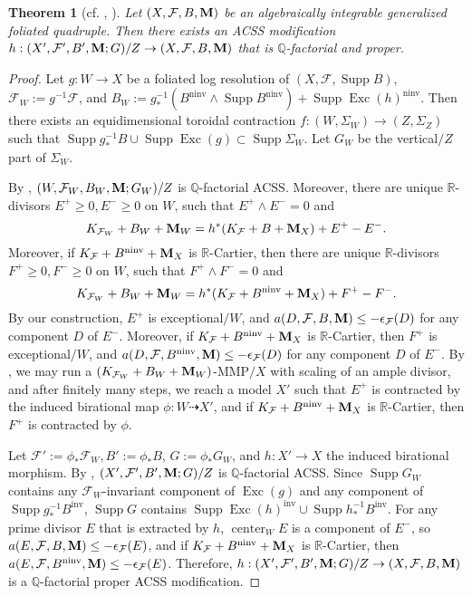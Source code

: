 \documentclass[12pt]{amsart}
\numberwithin{equation}{section}
\newcommand{\Mm}{{\bf{M}}}
\newcommand{\Qq}{\mathbb{Q}}
\newcommand{\Rr}{\mathbb{R}}
\newcommand{\Center}{\operatorname{center}}
\newcommand{\Exc}{\operatorname{Exc}}
\newcommand{\ninv}{\operatorname{ninv}}
\newcommand{\inv}{\operatorname{inv}}
\newcommand{\Supp}{\operatorname{Supp}}
\newcommand{\Ff}{\mathcal{F}}
\newtheorem{thm}{Theorem}[section]
\theoremstyle{definition}
\theoremstyle{definition}
\theoremstyle{definition}
\begin{document}
\begin{thm}[{cf. \cite[Theorem 8.2.2]{CHLX23}, \cite[Theorem 3.10]{ACSS21}}]\label{thm: eo acss model}
    Let $(X,\Ff,B,\Mm)$ be an algebraically integrable generalized foliated quadruple. Then there exists an ACSS modification $h: (X',\Ff',B',\Mm;G)/Z\rightarrow (X,\Ff,B,\Mm)$ that is $\Qq$-factorial and proper.
\end{thm}
\begin{proof}
    Let $g: W\rightarrow X$ be a foliated log resolution of $(X,\Ff,\Supp B)$, $\Ff_W:=g^{-1}\Ff$, and $B_W:=g^{-1}_\ast (B^{\ninv}\wedge\Supp B^{\ninv})+\Supp\Exc(h)^{\ninv}$. Then there exists an equidimensional toroidal contraction $f: (W,\Sigma_W)\rightarrow (Z,\Sigma_Z)$ such that $\Supp g^{-1}_\ast B\cup\Supp\Exc(g)\subset\Supp\Sigma_W$. Let $G_W$ be the vertical$/Z$ part of $\Sigma_W$. 

 By \cite[Lemma 7.3.3]{CHLX23}, $(W,\Ff_W,B_W,\Mm;G_W)/Z$ is $\Qq$-factorial ACSS. Moreover, there are unique $\Rr$-divisors $E^+\geq 0,E^{-}\geq 0$ on $W$, such that $E^+\wedge E^-=0$ and
 $$K_{\Ff_W}+B_W+\Mm_W=h^\ast (K_{\Ff}+B+\Mm_X)+E^+-E^-.$$
 Moreover, if $K_{\Ff}+B^{\ninv}+\Mm_X$ is $\Rr$-Cartier, then there are unique $\Rr$-divisors $F^+\geq 0,F^{-}\geq 0$ on $W$, such that $F^+\wedge F^-=0$ and
 $$K_{\Ff_W}+B_W+\Mm_W=h^\ast (K_{\Ff}+B^{\ninv}+\Mm_X)+F^+-F^-.$$
By our construction, $E^+$ is exceptional$/W$, and $a(D,\Ff,B,\Mm)\leq -\epsilon_{\Ff}(D)$ for any component $D$ of $E^-$.  Moreover, if $K_{\Ff}+B^{\ninv}+\Mm_X$ is $\Rr$-Cartier, then  $F^+$ is exceptional$/W$, and $a(D,\Ff,B^{\ninv},\Mm)\leq -\epsilon_{\Ff}(D)$ for any component $D$ of $E^-$. By \cite[Theorem 9.4.1]{CHLX23}, we may run a $(K_{\Ff_W}+B_W+\Mm_W)$-MMP$/X$ with scaling of an ample divisor, and after finitely many steps, we reach a model $X'$ such that $E^+$ is contracted by the induced birational map $\phi: W\dashrightarrow X'$, and if $K_{\Ff}+B^{\ninv}+\Mm_X$ is $\Rr$-Cartier, then $F^+$ is contracted by $\phi$.

Let $\Ff':=\phi_\ast \Ff_W,B':=\phi_\ast B$, $G:=\phi_\ast G_W$, and $h: X'\rightarrow X$ the induced birational morphism.  By \cite[Lemma 9.1.4]{CHLX23}, $(X',\Ff',B',\Mm;G)/Z$ is $\Qq$-factorial ACSS. Since $\Supp G_W$ contains any $\Ff_W$-invariant component of $\Exc(g)$ and any component of $\Supp g^{-1}_\ast B^{\inv}$, $\Supp G$ contains $\Supp\Exc(h)^{\inv}\cup\Supp h^{-1}_\ast B^{\inv}.$
For any prime divisor $E$ that is extracted by $h$, $\Center_WE$ is a component of $E^-$, so $a(E,\Ff,B,\Mm)\leq -\epsilon_{\Ff}(E)$, and if $K_{\Ff}+B^{\ninv}+\Mm_X$ is $\Rr$-Cartier, then  $a(E,\Ff,B^{\ninv},\Mm)\leq -\epsilon_{\Ff}(E)$. Therefore,  $h: (X',\Ff',B',\Mm;G)/Z\rightarrow (X,\Ff,B,\Mm)$ is a $\Qq$-factorial proper ACSS modification.
\end{proof}
\end{document}
